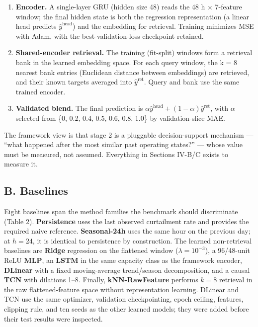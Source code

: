\documentclass[
  10pt,
  a4paper,
]{article}
\providecommand{\tightlist}{%
  \setlength{\itemsep}{0pt}\setlength{\parskip}{0pt}}
\begin{document}
\begin{enumerate}
\def\labelenumi{\arabic{enumi}.}
\tightlist
\item
  \textbf{Encoder.} A single-layer GRU (hidden size 48) reads the 48 h ×
  7-feature window; the final hidden state is both the regression
  representation (a linear head predicts \(\hat{y}^{\text{head}}\)) and
  the embedding for retrieval. Training minimizes MSE with Adam, with
  the best-validation-loss checkpoint retained.
\item
  \textbf{Shared-encoder retrieval.} The training (fit-split) windows
  form a retrieval bank in the learned embedding space. For each query
  window, the k = 8 nearest bank entries (Euclidean distance between
  embeddings) are retrieved, and their known targets averaged into
  \(\hat{y}^{\text{ret}}\). Query and bank use the same trained encoder.
\item
  \textbf{Validated blend.} The final prediction is
  \(\alpha \hat{y}^{\text{head}} + (1-\alpha) \hat{y}^{\text{ret}}\),
  with \(\alpha\) selected from \{0, 0.2, 0.4, 0.5, 0.6, 0.8, 1.0\} by
  validation-slice MAE.
\end{enumerate}

The framework view is that stage 2 is a pluggable decision-support
mechanism --- ``what happened after the most similar past operating
states?'' --- whose value must be measured, not assumed. Everything in
Sections IV-B/C exists to measure it.

\subsection{B. Baselines}\label{b.-baselines}

Eight baselines span the method families the benchmark should
discriminate (Table 2). \textbf{Persistence} uses the last observed
curtailment rate and provides the required naive reference.
\textbf{Seasonal-24h} uses the same hour on the previous day; at
\(h{=}24\), it is identical to persistence by construction. The learned
non-retrieval baselines are \textbf{Ridge} regression on the flattened
window (\(\lambda=10^{-3}\)), a 96/48-unit ReLU \textbf{MLP}, an
\textbf{LSTM} in the same capacity class as the framework encoder,
\textbf{DLinear} with a fixed moving-average trend/season decomposition,
and a causal \textbf{TCN} with dilations 1--8. Finally,
\textbf{kNN-RawFeature} performs \(k=8\) retrieval in the raw
flattened-feature space without representation learning. DLinear and TCN
use the same optimizer, validation checkpointing, epoch ceiling,
features, clipping rule, and ten seeds as the other learned models; they
were added before their test results were inspected.
\end{document}
